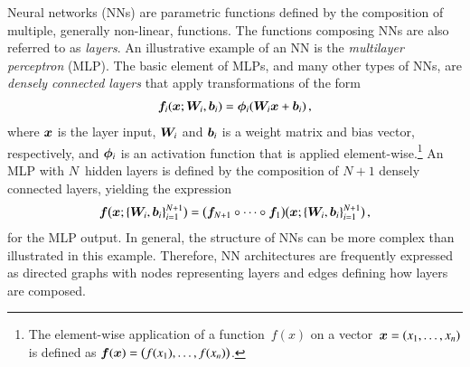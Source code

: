 Neural networks (NNs) are parametric functions defined by the composition of
multiple, generally non-linear, functions. The functions composing NNs are also
referred to as \emph{layers}. An illustrative example of an NN is the
\emph{multilayer perceptron} (MLP). The basic element of MLPs, and many other
types of NNs, are \emph{densely connected layers} that apply transformations of
the form
\begin{align*}
  \bm{f}_i(\bm{x}; \bm{W}_i, \bm{b}_i) = \bm{\phi}_i(\bm{W}_i \bm{x} + \bm{b}_i) \,\text{,}
\end{align*}
where $\bm{x}$ is the layer input, $\bm{W}_i$ and $\bm{b}_i$ is a
weight matrix and bias vector, respectively, and $\bm{\phi}_i$ is an
activation function that is applied element-wise.\footnote{The element-wise
  application of a function~$f(x)$ on a vector~$\bm{x} = (x_1, \dots, x_n)$
  is defined as $\bm{f}(\bm{x}) = \bigl( f(x_1), \dots, f(x_n) \bigr)$.}
An MLP with $N$~hidden layers is defined by the composition of $N + 1$ densely
connected layers, yielding the expression
\begin{align*}
  \bm{f}\bigl( \bm{x}; \{\bm{W}_{i},\bm{b}_{i} \}_{i=1}^{N+1} \bigr)
  = \bigl( \bm{f}_{N+1} \circ \dots \circ \bm{f}_{1} \bigr)
  \bigl( \bm{x}; \{\bm{W}_i, \bm{b}_i\}_{i=1}^{N+1} \bigr)
  \,\text{,}
\end{align*}
for the MLP output. In general, the structure of NNs can be more complex than
illustrated in this example. Therefore, NN architectures are frequently
expressed as directed graphs with nodes representing layers and edges defining
how layers are composed.


